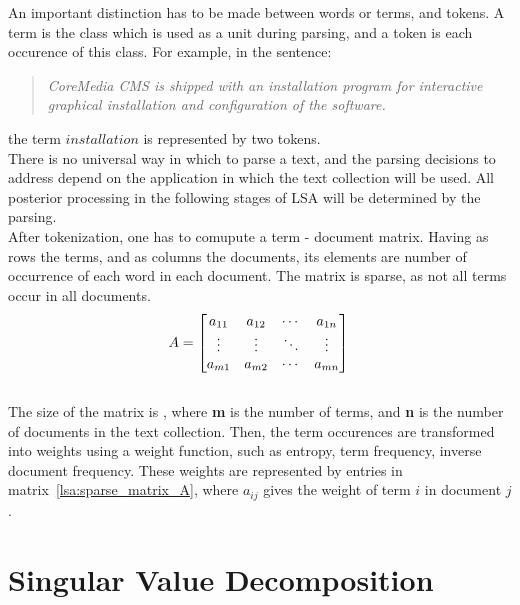 An important distinction has to be made between words or terms, and tokens. A term is the class which is used as a unit during parsing, and a token is each occurence of this class. For example, in the sentence: 

\begin{quote}
\textit{CoreMedia CMS is shipped with an installation program for interactive graphical installation and configuration of the software.}
\end{quote}

the term $ installation $ is represented by two tokens. \\

There is no universal way in which to parse a text, and the parsing decisions to address depend on the application in which the text collection will be used. All posterior processing in the following stages of \gls{LSA} will be determined by the parsing. \\

After tokenization, one has to comupute a term - document matrix. Having as rows the terms, and as columns the documents, its elements are number of occurrence of each word in each document. The matrix is sparse, as not all terms occur in all documents.\\

%
%
\begin{equation}
A=
\begin{bmatrix}
\label{lsa:sparse_matrix_A}
 a_{11}& a_{12}& \cdots& a_{1n} \\
 \vdots& \vdots& \ddots& \vdots \\ 
 a_{m1}& a_{m2}& \cdots& a_{mn}
\end{bmatrix}\\
\end{equation}\\

The size of the matrix is , where {\bf m} is the number of terms, and {\bf n} is the number of documents in the text collection. Then, the term occurences are transformed into weights using a weight function, such as entropy, term frequency, inverse document frequency. These weights are represented by entries in matrix~\ref{lsa:sparse_matrix_A}, where $ a_{ij} $ gives the weight of term $ i $ in document $ j $. \\

\section{Singular Value Decomposition}

